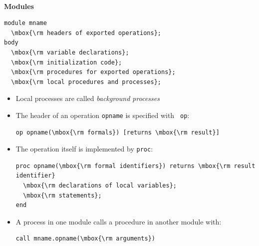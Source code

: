 \documentclass{article}
\newcommand{\bi}{\begin{itemize}}
\newcommand{\ii}{\item}
\newcommand{\ei}{\end{itemize}}
\newcommand{\ti}[1]{
\newpage
\mbox{~}

\vspace{1.25in}
\centerline{\bf #1}
}
\begin{document}
\ti{Modules}
\begin{Verbatim}
module mname
  \mbox{\rm headers of exported operations};
body
  \mbox{\rm variable declarations};
  \mbox{\rm initialization code};
  \mbox{\rm procedures for exported operations};
  \mbox{\rm local procedures and processes};
\end{Verbatim}
\bi
\ii Local processes are called {\em background processes}
\ii The header of an operation {\tt opname} is specified with {\tt
  op}:
\begin{Verbatim}
op opname(\mbox{\rm formals}) [returns \mbox{\rm result}]
\end{Verbatim}
\ii The operation itself is implemented by {\tt proc}:
\begin{Verbatim}
proc opname(\mbox{\rm formal identifiers}) returns \mbox{\rm result identifier}
  \mbox{\rm declarations of local variables};
  \mbox{\rm statements};
end
\end{Verbatim}
\ii A process in one module calls a procedure in another module with:
\begin{Verbatim}
call mname.opname(\mbox{\rm arguments})
\end{Verbatim}
\ei
\end{document}
